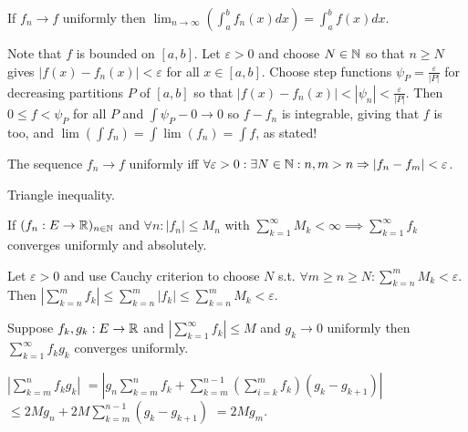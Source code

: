 \begin{multicols}{2}
\begin{theorem}[7.10]
If $f_n\to f$ uniformly then $\lim_{n\to\infty}\left(\int_a^b f_n(x)dx\right) = \int_a^b f(x)dx$.
\end{theorem}
\begin{proof1}
Note that $f$ is bounded on $[a,b]$. Let $\varepsilon>0$ and choose $N\in\mathbb{N}$ so that $n\geq N$ gives $|f(x)-f_n(x)|<\varepsilon$ for all $x\in[a,b]$. Choose step functions $\psi_P = \frac{\varepsilon}{|P|}$ for decreasing partitions $P$ of $[a,b]$ so that $|f(x)-f_n(x)|<|\psi_n|<\frac{\varepsilon}{|P|}$. Then $0\leq f < \psi_P$ for all $P$ and $\int\psi_P-0\to 0$ so $f-f_n$ is integrable, giving that $f$ is too, and $\lim(\int f_n) = \int\lim(f_n) = \int f$, as stated!
\end{proof1}

\begin{theorem}
The sequence $f_n\to f$ uniformly iff $\forall\varepsilon>0:\exists N\in\mathbb{N}: n,m>n\Rightarrow |f_n-f_m|<\varepsilon$.
\end{theorem}
\begin{proof1}
Triangle inequality.
\end{proof1}

\begin{theorem} If $(f_n:E\to \mathbb{R})_{n\in\mathbb{N}}$ and $\forall n: |f_n|\leq M_n$ with $\sum_{k=1}^\infty M_k <\infty \implies \sum_{k=1}^\infty f_k$ converges uniformly and absolutely. 
\end{theorem}
\begin{proof1}
Let $\varepsilon>0$ and use Cauchy criterion to choose $N$ s.t. $\forall m\geq n\geq N: \sum_{k=n}^m M_k<\varepsilon$. Then $\left|\sum_{k=n}^m f_k\right|\leq \sum_{k=n}^m |f_k|\leq \sum_{k=n}^m M_k<\varepsilon$.
\end{proof1}

\begin{theorem}
Suppose $f_k,g_k:E\to\mathbb{R}$ and $\left|\sum_{k=1}^\infty f_k\right|\leq M$ and $g_k\to0$ uniformly then $\sum_{k=1}^\infty f_kg_k$ converges uniformly.
\end{theorem}
\begin{proof1}
$\left|\sum_{k=m}^n f_kg_k\right|$ $=\left|g_n\sum_{k=m}^n f_k + \sum_{k=m}^{n-1}\left(\sum_{i=k}^mf_k\right)(g_k-g_{k+1})\right|$ $\leq 2Mg_n + 2M\sum_{k=m}^{n-1} (g_k-g_{k+1})$ $= 2Mg_m$.
\end{proof1}
\end{multicols}
